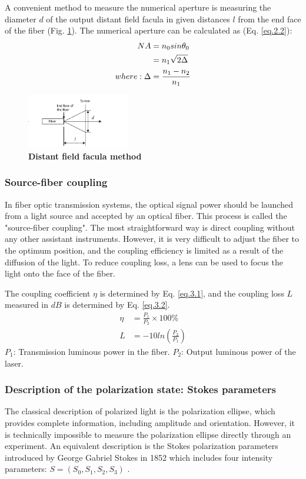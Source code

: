 \documentclass[10pt,a4paper,twocolumn,twoside,UTF8]{article}
\begin{document}
		A convenient method to measure the numerical aperture is measuring the diameter $d$ of the output distant field facula in given distances $l$ from the end face of the fiber (Fig. \ref{fig.illus-2.2}). 
		The numerical aperture can be calculated as (Eq. \ref{eq.2.2}):
		\begin{align}
			NA &= n_0sin\theta_0 \notag \\
			   &= n_1\sqrt{2\Delta} \label{eq.2.2} \\
			where: \Delta &= \frac{n_1-n_2}{n_1} \notag
		\end{align}
		\begin{figure}[htbp]
			\centering
			\includegraphics[width=0.4\textwidth]{attachments/illus-2.2.png}
			\caption{\textbf{Distant field facula method}}
			\label{fig.illus-2.2}
		\end{figure}

		\subsubsection{Source-fiber coupling}
		In fiber optic transmission systems, the optical signal power should be launched from a light source and accepted by an optical fiber. 
		This process is called the "source-fiber coupling". The most straightforward way is direct coupling without any other assistant instruments. 
		However, it is very difficult to adjust the fiber to the optimum position, and the coupling efficiency is limited as a result of the diffusion of the light. 
		To reduce coupling loss, a lens can be used to focus the light onto the face of the fiber.

		The coupling coefficient $\eta$ is determined by Eq. \ref{eq.3.1}, and the coupling loss $L$ measured in $dB$ is determined by Eq. \ref{eq.3.2}. 
		\begin{align}
			\eta &= \frac{P_1}{P_2} \times 100\% \label{eq.3.1} \\
			L   &= -10ln(\frac{P_2}{P_1}) \label{eq.3.2} 
		\end{align}
		$P_1$: Transmission luminous power in the fiber. $P_2$: Output luminous power of the laser.

		\subsubsection{Description of the polarization state: Stokes parameters}
		The classical description of polarized light is the polarization ellipse, which provides complete information, including amplitude and orientation. 
		However, it is technically impossible to measure the polarization ellipse directly through an experiment. 
		An equivalent description is the Stokes polarization parameters introduced by George Gabriel Stokes in 1852 which includes four intensity parameters: $S = (S_0, S_1, S_2, S_3)$ .
\end{document}
